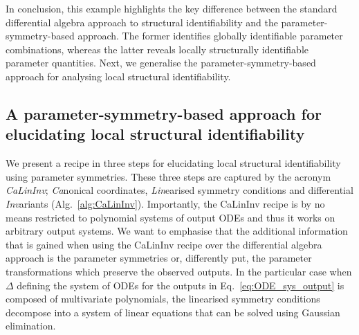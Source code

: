 \documentclass[12pt]{article}
\begin{document}
{In conclusion, this example highlights the key difference between the standard differential algebra approach to structural identifiability and the parameter-symmetry-based approach. The former identifies globally identifiable parameter combinations, whereas the latter reveals locally structurally identifiable parameter quantities. Next, we generalise the parameter-symmetry-based approach for analysing local structural identifiability.


\subsection{A parameter-symmetry-based approach for elucidating local structural identifiability}

We present a recipe in three steps for elucidating local structural identifiability using parameter symmetries. These three steps are captured by the acronym \textit{CaLinInv}; \textit{Ca}nonical coordinates, \textit{Lin}earised symmetry conditions and differential \textit{Inv}ariants (Alg.~\ref{alg:CaLinInv}). Importantly, the CaLinInv recipe is by no means restricted to polynomial systems of output ODEs and thus it works on arbitrary output systems. We want to emphasise that the additional information that is gained when using the CaLinInv recipe over the differential algebra approach is the parameter symmetries or, differently put, the parameter transformations which preserve the observed outputs. In the particular case when $\Delta$ defining the system of ODEs for the outputs in Eq.~\eqref{eq:ODE_sys_output} is composed of multivariate polynomials, the linearised symmetry conditions decompose into a system of linear equations that can be solved using Gaussian elimination. 

}
\end{document}
